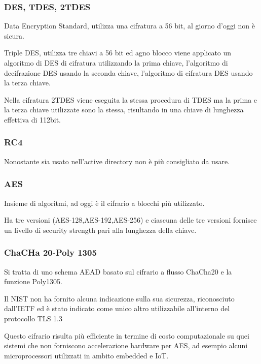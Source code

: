 \subsubsection{DES, TDES, 2TDES}\label{des-tdes-2tdes}

Data Encryption Standard, utilizza una cifratura a 56 bit, al giorno
d'oggi non è sicura.

Triple DES, utilizza tre chiavi a 56 bit ed agno blocco viene applicato
un algoritmo di DES di cifratura utilizzando la prima chiave,
l'algoritmo di decifrazione DES usando la seconda chiave, l'algoritmo di
cifratura DES usando la terza chiave.

Nella cifratura 2TDES viene eseguita la stessa procedura di TDES ma la
prima e la terza chiave utilizzate sono la stessa, risultando in una
chiave di lunghezza effettiva di 112bit.

\subsubsection{RC4}\label{rc4}

Nonostante sia usato nell'active directory non è più consigliato da
usare.

\subsubsection{AES}\label{aes}

Insieme di algoritmi, ad oggi è il cifrario a blocchi più utilizzato.

Ha tre versioni (AES-128,AES-192,AES-256) e ciascuna delle tre versioni
fornisce un livello di security strength pari alla lunghezza della
chiave.

\subsubsection{ChaCHa 20-Poly 1305}\label{chacha-20-poly-1305}

Si tratta di uno schema AEAD basato sul cifrario a flusso ChaCha20 e la
funzione Poly1305.

Il NIST non ha fornito alcuna indicazione sulla sua sicurezza,
riconosciuto dall'IETF ed è stato indicato come unico altro utilizzabile
all'interno del protocollo TLS 1.3

Questo cifrario risulta più efficiente in termine di costo
computazionale su quei sistemi che non forniscono accelerazione hardware
per AES, ad esempio alcuni microprocessori utilizzati in ambito embedded
e IoT.

